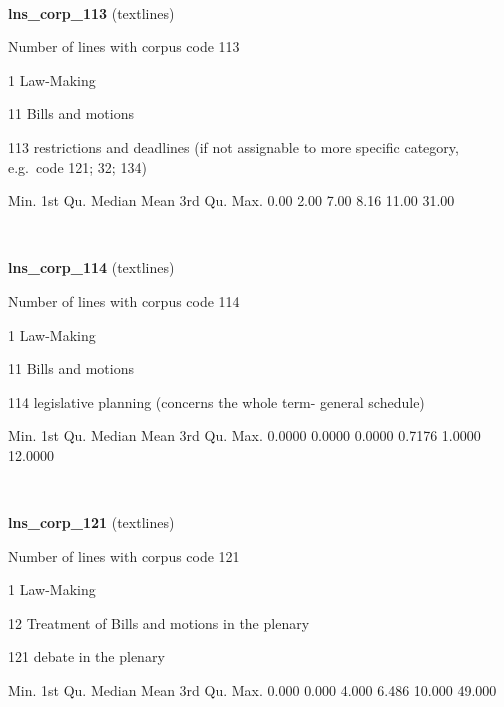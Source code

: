 \documentclass[]{article}
\newenvironment{Shaded}{\begin{snugshade}}{\end{snugshade}}
\newcommand{\FloatTok}[1]{\textcolor[rgb]{0.00,0.00,0.81}{{#1}}}
\newcommand{\NormalTok}[1]{{#1}}
\begin{document}
~

\vspace{1em}

\textbf{lns\_corp\_113} (textlines)

Number of lines with corpus code 113

1 Law-Making

11 Bills and motions

113 restrictions and deadlines (if not assignable to more specific
category, e.g.~code 121; 32; 134)

\begin{Shaded}
\begin{Highlighting}[]
   \NormalTok{Min. 1st Qu.  Median    Mean 3rd Qu.    Max. }
   \FloatTok{0.00}    \FloatTok{2.00}    \FloatTok{7.00}    \FloatTok{8.16}   \FloatTok{11.00}   \FloatTok{31.00} 
\end{Highlighting}
\end{Shaded}

~

\vspace{1em}

\textbf{lns\_corp\_114} (textlines)

Number of lines with corpus code 114

1 Law-Making

11 Bills and motions

114 legislative planning (concerns the whole term- general schedule)

\begin{Shaded}
\begin{Highlighting}[]
   \NormalTok{Min. 1st Qu.  Median    Mean 3rd Qu.    Max. }
 \FloatTok{0.0000}  \FloatTok{0.0000}  \FloatTok{0.0000}  \FloatTok{0.7176}  \FloatTok{1.0000} \FloatTok{12.0000} 
\end{Highlighting}
\end{Shaded}

~

\vspace{1em}

\textbf{lns\_corp\_121} (textlines)

Number of lines with corpus code 121

1 Law-Making

12 Treatment of Bills and motions in the plenary

121 debate in the plenary

\begin{Shaded}
\begin{Highlighting}[]
   \NormalTok{Min. 1st Qu.  Median    Mean 3rd Qu.    Max. }
  \FloatTok{0.000}   \FloatTok{0.000}   \FloatTok{4.000}   \FloatTok{6.486}  \FloatTok{10.000}  \FloatTok{49.000} 
\end{Highlighting}
\end{Shaded}
\end{document}
